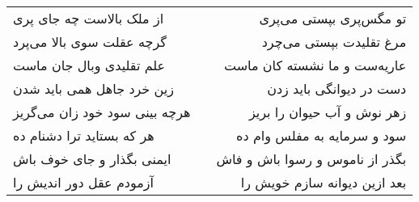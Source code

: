 \begin{center}
\begin{longtable}{l p{0.5cm} r}
\\
از ملک بالاست چه جای پری
&&
تو مگس‌پری بپستی می‌پری
\\
گرچه عقلت سوی بالا می‌پرد
&&
مرغ تقلیدت بپستی می‌چرد
\\
علم تقلیدی وبال جان ماست
&&
عاریه‌ست و ما نشسته کان ماست
\\
زین خرد جاهل همی باید شدن
&&
دست در دیوانگی باید زدن
\\
هرچه بینی سود خود زان می‌گریز
&&
زهر نوش و آب حیوان را بریز
\\
هر که بستاید ترا دشنام ده
&&
سود و سرمایه به مفلس وام ده
\\
ایمنی بگذار و جای خوف باش
&&
بگذر از ناموس و رسوا باش و فاش
\\
آزمودم عقل دور اندیش را
&&
بعد ازین دیوانه سازم خویش را
\\
\end{longtable}
\end{center}
